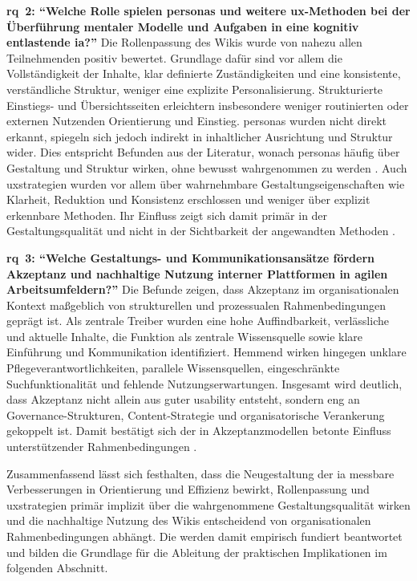 \textbf{\Gls{rq}~2: \enquote{Welche Rolle spielen \Gls{personas} und weitere \Gls{ux}-Methoden bei der Überführung mentaler Modelle und Aufgaben in eine kognitiv entlastende \acrlong{ia}?}}
Die Rollenpassung des Wikis wurde von nahezu allen Teilnehmenden positiv bewertet. Grundlage dafür sind vor allem die Vollständigkeit der Inhalte, klar definierte Zuständigkeiten und eine konsistente, verständliche Struktur, weniger eine explizite Personalisierung. Strukturierte Einstiegs- und Übersichtsseiten erleichtern insbesondere weniger routinierten oder externen Nutzenden Orientierung und Einstieg. \Gls{personas} wurden nicht direkt erkannt, spiegeln sich jedoch indirekt in inhaltlicher Ausrichtung und Struktur wider. Dies entspricht Befunden aus der Literatur, wonach \Gls{personas} häufig über Gestaltung und Struktur wirken, ohne bewusst wahrgenommen zu werden \cite{112:StepTwoPersonas,308:DWGSegmentation}. Auch \Gls{uxstrategien} wurden vor allem über wahrnehmbare Gestaltungseigenschaften wie Klarheit, Reduktion und Konsistenz erschlossen und weniger über explizit erkennbare Methoden. Ihr Einfluss zeigt sich damit primär in der Gestaltungsqualität und nicht in der Sichtbarkeit der angewandten Methoden \cite{401:Garrett2011,300:FraunhoferIESE2018}.

\textbf{\Gls{rq}~3: \enquote{Welche Gestaltungs- und Kommunikationsansätze fördern Akzeptanz und nachhaltige Nutzung interner Plattformen in agilen Arbeitsumfeldern?}}
Die Befunde zeigen, dass Akzeptanz im organisationalen Kontext maßgeblich von strukturellen und prozessualen Rahmenbedingungen geprägt ist. Als zentrale Treiber wurden eine hohe Auffindbarkeit, verlässliche und aktuelle Inhalte, die Funktion als zentrale Wissensquelle sowie klare Einführung und Kommunikation identifiziert. Hemmend wirken hingegen unklare Pflegeverantwortlichkeiten, parallele Wissensquellen, eingeschränkte Suchfunktionalität und fehlende Nutzungserwartungen. Insgesamt wird deutlich, dass Akzeptanz nicht allein aus guter \Gls{usability} entsteht, sondern eng an Governance-Strukturen, Content-Strategie und organisatorische Verankerung gekoppelt ist. Damit bestätigt sich der in Akzeptanzmodellen betonte Einfluss unterstützender Rahmenbedingungen \cite{103:Venkatesh2003,117:Horton2001,115:NNGContentManagement}.

\newpage

Zusammenfassend lässt sich festhalten, dass die Neugestaltung der \Gls{ia} messbare Verbesserungen in Orientierung und Effizienz bewirkt, Rollenpassung und \Gls{uxstrategien} primär implizit über die wahrgenommene Gestaltungsqualität wirken und die nachhaltige Nutzung des Wikis entscheidend von organisationalen Rahmenbedingungen abhängt. Die  werden damit empirisch fundiert beantwortet und bilden die Grundlage für die Ableitung der praktischen Implikationen im folgenden Abschnitt.
